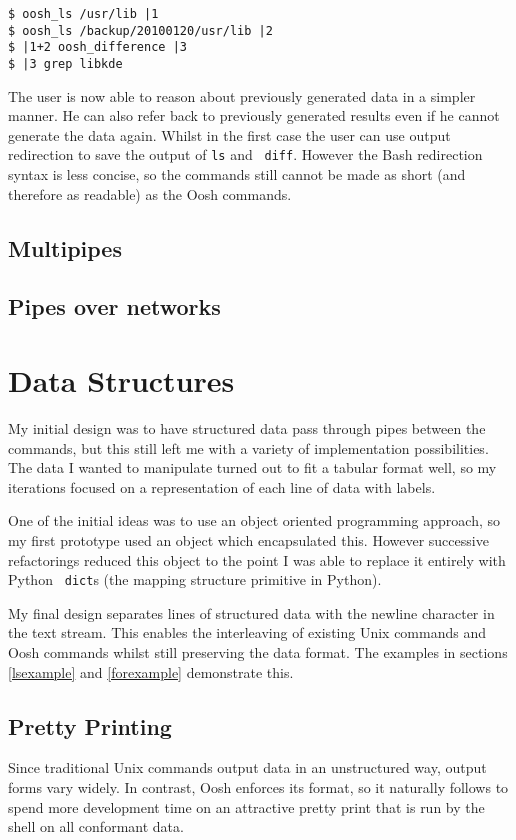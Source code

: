 \documentclass[12pt,twoside,notitlepage]{report}
\begin{document}
\begin{verbatim}
$ oosh_ls /usr/lib |1
$ oosh_ls /backup/20100120/usr/lib |2
$ |1+2 oosh_difference |3
$ |3 grep libkde
\end{verbatim}

The user is now able to reason about previously generated data in a simpler
manner. He can also refer back to previously generated results even if he cannot
generate the data again. Whilst in the first case %
the user can use output redirection to save the output of {\tt ls} and {\tt
  diff}. However the Bash redirection syntax is less concise, so the commands
still cannot be made as short (and therefore as readable) %
as the Oosh commands.

\subsection{Multipipes}

\subsection{Pipes over networks}

\section{Data Structures}
My initial design was to have structured data pass through pipes between the
commands, but this still left me with a variety of implementation
possibilities. The data I wanted to manipulate turned out to fit a tabular
format well, so my iterations focused on a representation of each line of data
with labels. %

One of the initial ideas was to use an object oriented programming approach, so
my first prototype %
used an object which encapsulated this. However successive refactorings reduced
this object to the point I was able to replace it entirely with Python {\tt
  dict}s (the mapping structure primitive in Python).

My final design separates lines of structured data with the newline character in
the text stream. This enables the interleaving of existing Unix commands and
Oosh commands whilst still preserving the data format. The examples in sections
\ref{lsexample} and \ref{forexample} demonstrate this.

\subsection{Pretty Printing}
Since traditional Unix commands output data in an unstructured way, output forms
vary widely. In contrast, Oosh enforces its format, so it naturally follows to
spend more development time on an attractive pretty print that is run by the
shell on all conformant data.
\end{document}
